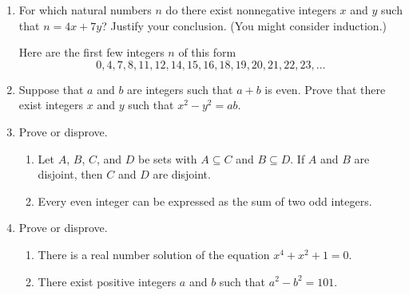 \documentclass[12pt]{article}
\begin{document}
\begin{enumerate}
\item For which natural numbers $n$ do there exist nonnegative integers $x$ and $y$ such that $n=4x+7y$?
  Justify your conclusion.  (You might consider induction.)

  Here are the first few integers $n$ of this form
  \[
  0, 4, 7, 8, 11, 12, 14, 15, 16, 18, 19, 20, 21, 22, 23, \dotsc
  \]


\item  Suppose that $a$ and $b$ are integers such that $a+b$ is even.
  Prove that there exist integers $x$ and $y$ such that $x^2-y^2=ab$.

\item  Prove or disprove.
  \begin{enumerate}
    \item   Let $A$, $B$, $C$, and $D$ be sets with $A\subseteq C$ and $B\subseteq D$.
      If $A$ and $B$ are disjoint, then $C$ and $D$ are disjoint.

    \item Every even integer can be expressed as the sum of two odd integers.
  \end{enumerate}


\item  Prove or disprove.
  \begin{enumerate}
    \item  
  There is a real number solution of the equation $x^4+x^2+1=0$.
\item  
  There exist positive integers $a$ and $b$ such that $a^2-b^2=101$.
  \end{enumerate}


  
\end{enumerate}
\end{document}
